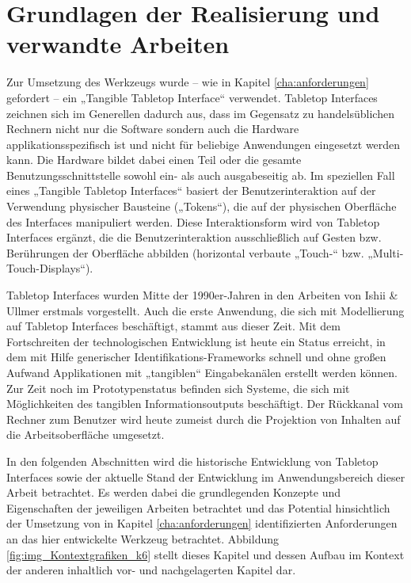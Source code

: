 
\chapter{Grundlagen der Realisierung und verwandte Arbeiten} %
\label{cha:implementierung_Überblick}

Zur Umsetzung des Werkzeugs wurde -- wie in Kapitel \ref{cha:anforderungen} gefordert -- ein „Tangible Tabletop Interface“ verwendet. Tabletop Interfaces zeichnen sich im Generellen dadurch aus, dass im Gegensatz zu handelsüblichen Rechnern nicht nur die Software sondern auch die Hardware applikationsspezifisch ist und nicht für beliebige Anwendungen eingesetzt werden kann. Die Hardware bildet dabei einen Teil oder die gesamte Benutzungsschnittstelle sowohl ein- als auch ausgabeseitig ab. Im speziellen Fall eines „Tangible Tabletop Interfaces“ basiert der Benutzerinteraktion auf der Verwendung physischer Bausteine („Tokens“), die auf der physischen Oberfläche des Interfaces manipuliert werden. Diese Interaktionsform wird von Tabletop Interfaces ergänzt, die die Benutzerinteraktion ausschließlich auf Gesten bzw. Berührungen der Oberfläche abbilden (horizontal verbaute „Touch-“ bzw. „Multi-Touch-Displays“).

Tabletop Interfaces wurden Mitte der 1990er-Jahren in den Arbeiten von Ishii \& Ullmer erstmals vorgestellt. Auch die erste Anwendung, die sich mit Modellierung auf Tabletop Interfaces beschäftigt, stammt aus dieser Zeit. Mit dem Fortschreiten der technologischen Entwicklung ist heute ein Status erreicht, in dem mit Hilfe generischer Identifikations-Frameworks schnell und ohne großen Aufwand Applikationen mit „tangiblen“ Eingabekanälen erstellt werden können. Zur Zeit noch im Prototypenstatus befinden sich Systeme, die sich mit Möglichkeiten des tangiblen Informationsoutputs beschäftigt. Der Rückkanal vom Rechner zum Benutzer wird heute zumeist durch die Projektion von Inhalten auf die Arbeitsoberfläche umgesetzt.

In den folgenden Abschnitten wird die historische Entwicklung von Tabletop Interfaces sowie der aktuelle Stand der Entwicklung im Anwendungsbereich dieser Arbeit betrachtet. Es werden dabei die grundlegenden Konzepte und Eigenschaften der jeweiligen Arbeiten betrachtet und das Potential hinsichtlich der Umsetzung von in Kapitel \ref{cha:anforderungen} identifizierten Anforderungen an das hier entwickelte Werkzeug betrachtet. Abbildung \ref{fig:img_Kontextgrafiken_k6} stellt dieses Kapitel und dessen Aufbau im Kontext der anderen inhaltlich vor- und nachgelagerten Kapitel dar.

